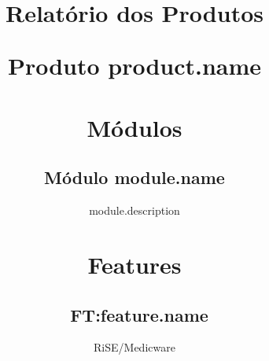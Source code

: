 \documentclass[10pt]{book}
\begin{document}
 

\title{Relatório dos Produtos {%
\author{RiSE/Medicware} %

\maketitle
\frontmatter 
\tableofcontents

\mainmatter

{%
	\chapter{Produto {{product.name}}}
	\section{Módulos}
	{%
		\subsection{Módulo {{module.name}}}
		{{module.description}}
	{%
	
	\section{Features}
	{%
		{%
			\subsection{~FT:{{feature.name}}}
			\label{ft{{feature.id}}}
			
}}}}}}}
\end{document}
